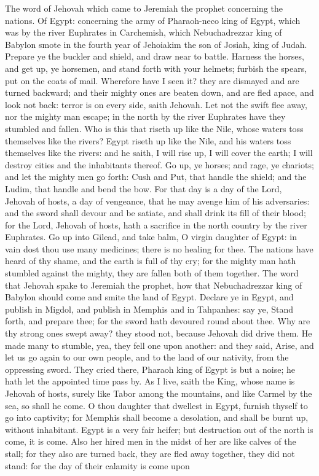 The word of Jehovah which came to Jeremiah the prophet concerning the nations.  Of Egypt: concerning the army of Pharaoh-neco king of Egypt, which was by the river Euphrates in Carchemish, which Nebuchadrezzar king of Babylon smote in the fourth year of Jehoiakim the son of Josiah, king of Judah.  Prepare ye the buckler and shield, and draw near to battle. Harness the horses, and get up, ye horsemen, and stand forth with your helmets; furbish the spears, put on the coats of mail. Wherefore have I seen it? they are dismayed and are turned backward; and their mighty ones are beaten down, and are fled apace, and look not back: terror is on every side, saith Jehovah. Let not the swift flee away, nor the mighty man escape; in the north by the river Euphrates have they stumbled and fallen. Who is this that riseth up like the Nile, whose waters toss themselves like the rivers? Egypt riseth up like the Nile, and his waters toss themselves like the rivers: and he saith, I will rise up, I will cover the earth; I will destroy cities and the inhabitants thereof. Go up, ye horses; and rage, ye chariots; and let the mighty men go forth: Cush and Put, that handle the shield; and the Ludim, that handle and bend the bow. For that day is a day of the Lord, Jehovah of hosts, a day of vengeance, that he may avenge him of his adversaries: and the sword shall devour and be satiate, and shall drink its fill of their blood; for the Lord, Jehovah of hosts, hath a sacrifice in the north country by the river Euphrates. Go up into Gilead, and take balm, O virgin daughter of Egypt: in vain dost thou use many medicines; there is no healing for thee. The nations have heard of thy shame, and the earth is full of thy cry; for the mighty man hath stumbled against the mighty, they are fallen both of them together.  The word that Jehovah spake to Jeremiah the prophet, how that Nebuchadrezzar king of Babylon should come and smite the land of Egypt.  Declare ye in Egypt, and publish in Migdol, and publish in Memphis and in Tahpanhes: say ye, Stand forth, and prepare thee; for the sword hath devoured round about thee. Why are thy strong ones swept away? they stood not, because Jehovah did drive them. He made many to stumble, yea, they fell one upon another: and they said, Arise, and let us go again to our own people, and to the land of our nativity, from the oppressing sword. They cried there, Pharaoh king of Egypt is but a noise; he hath let the appointed time pass by. As I live, saith the King, whose name is Jehovah of hosts, surely like Tabor among the mountains, and like Carmel by the sea, so shall he come. O thou daughter that dwellest in Egypt, furnish thyself to go into captivity; for Memphis shall become a desolation, and shall be burnt up, without inhabitant. Egypt is a very fair heifer; but destruction out of the north is come, it is come. Also her hired men in the midst of her are like calves of the stall; for they also are turned back, they are fled away together, they did not stand: for the day of their calamity is come upon 